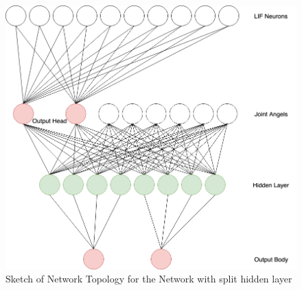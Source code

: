\begin{figure}[htpb]
  \centering
  \includegraphics[width=\textwidth]{figures/plots/M2netTop}
  \caption{ Sketch of Network Topology for the Network with split hidden layer  }
  \label{fig:M2netTop}
\end{figure}

